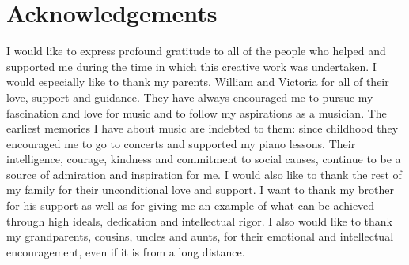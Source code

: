 \chapter*{Acknowledgements}

I would like to express profound gratitude to all of the people who helped and supported me during the time in which this creative work was undertaken. I would especially like to thank my parents, William and Victoria for all of their love, support and guidance. They have always encouraged me to pursue my fascination and love for music and to follow my aspirations as a musician. The earliest memories I have about music are indebted to them: since childhood they encouraged me to go to concerts and supported my piano lessons. Their intelligence, courage, kindness and commitment to social causes, continue to be a source of admiration and inspiration for me. I would also like to thank the rest of my family for their unconditional love and support. I want to thank my brother for his support as well as for giving me an example of what can be achieved through high ideals, dedication and intellectual rigor. I also would like to thank my grandparents, cousins, uncles and aunts, for their emotional and intellectual encouragement, even if it is from a long distance.



%








